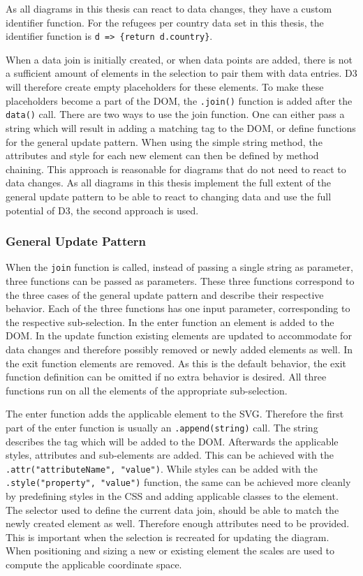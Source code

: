 As all diagrams in this thesis can react to data changes, they have a custom identifier function. For the refugees per country data set in this thesis, the identifier function is \verb|d => {return d.country}|.

When a data join is initially created, or when data points are added, there is not a sufficient amount of elements in the selection to pair them with data entries. D3 will therefore create empty placeholders for these elements. To make these placeholders become a part of the DOM, the \verb|.join()| function is added after the \texttt{data()} call. There are two ways to use the join function. One can either pass a string which will result in adding a matching tag to the DOM, or define functions for the general update pattern. When using the simple string method, the attributes and style for each new element can then be defined by method chaining. This approach is reasonable for diagrams that do not need to react to data changes. As all diagrams in this thesis implement the full extent of the general update pattern to be able to react to changing data and use the full potential of D3, the second approach is used.

\subsubsection{General Update Pattern}

When the \texttt{join} function is called, instead of passing a single string as parameter, three functions can be passed as parameters. These three functions correspond to the three cases of the general update pattern and describe their respective behavior. Each of the three functions has one input parameter, corresponding to the respective sub-selection. In the enter function an element is added to the DOM. In the update function existing elements are updated to accommodate for data changes and therefore possibly removed or newly added elements as well. In the exit function elements are removed. As this is the default behavior, the exit function definition can be omitted if no extra behavior is desired. All three functions run on all the elements of the appropriate sub-selection.

The enter function adds the applicable element to the SVG. Therefore the first part of the enter function is usually an \texttt{.append(string)} call. The string describes the tag which will be added to the DOM. Afterwards the applicable styles, attributes and sub-elements are added. This can be achieved with the \texttt{.attr("attributeName", "value")}. While styles can be added with the \texttt{.style("property", "value")} function, the same can be achieved more cleanly by predefining styles in the CSS and adding applicable classes to the element. The selector used to define the current data join, should be able to match the newly created element as well. Therefore enough attributes need to be provided. This is important when the selection is recreated for updating the diagram. When positioning and sizing a new or existing element the scales are used to compute the applicable coordinate space.

